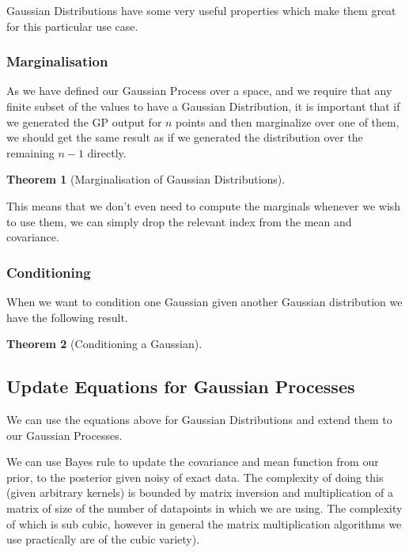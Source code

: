 \documentclass[12pt, a4paper]{report}
\theoremstyle{definition}
\newtheorem{theorem}{Theorem}[section]
\theoremstyle{definition}
\theoremstyle{definition}
\begin{document}
Gaussian Distributions have some very useful properties which make them great for this particular use case.



\subsubsection{Marginalisation}

As we have defined our Gaussian Process over a space, and we require that any finite subset of the values to have a Gaussian Distribution, it is important that if we generated the GP output for $n$ points and then marginalize over one of them, we should  get the same result as if we generated the distribution over the remaining $n-1$ directly.

\begin{theorem}[Marginalisation of Gaussian Distributions]
    
\end{theorem}

This means that we don't even need to compute the marginals whenever we wish to use them, we can simply drop the relevant index from the mean and covariance.
 

\subsubsection{Conditioning}

When we want to condition one Gaussian given another Gaussian distribution we have the following result.


\begin{theorem}[Conditioning a Gaussian]

\end{theorem}


\subsection{Update Equations for Gaussian Processes}

We can use the equations above for Gaussian Distributions and extend them to our Gaussian Processes.

We can use Bayes rule to update the covariance and mean function from our prior, to the posterior given noisy of exact data. The complexity of doing this (given arbitrary kernels) is bounded by matrix inversion and  multiplication of a matrix of size of the number of datapoints in which we are using. The complexity of which is sub cubic, however in general the matrix multiplication algorithms we use practically are of the cubic variety).
\end{document}
